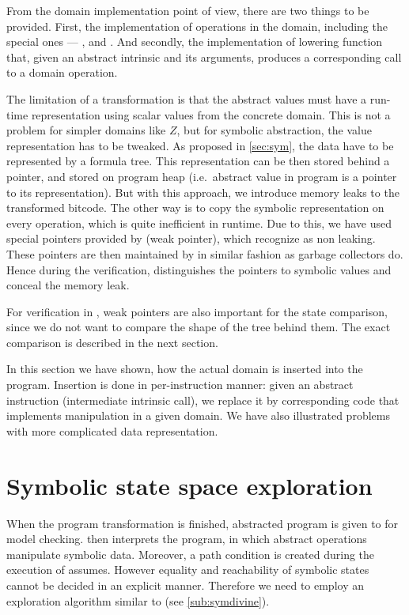 From the domain implementation point of view, there are two things to be
provided. First, the implementation of operations in the domain, including
the special ones --- ,  and .
And secondly, the implementation of lowering function that, given an abstract
\LART intrinsic and its arguments, produces a corresponding call to a domain
operation.

The limitation of a transformation is that the abstract values must have a
run-time representation using scalar values from the concrete domain. This is
not a problem for simpler domains like $Z$, but for symbolic abstraction, the
value representation has to be tweaked. As proposed in \autoref{sec:sym}, the
data have to be represented by a formula tree. This representation can be
then stored behind a pointer, and stored on program heap (i.e.~abstract value in
program is a pointer to its representation). But with this approach, we
introduce memory leaks to the transformed bitcode. The other way is to copy the symbolic
representation on every operation, which is quite inefficient in runtime. Due to
this, we have used special pointers provided by \DIVINE (weak pointer), which
\DIVINE recognize as non leaking. These pointers are then maintained by \DIVM in
similar fashion as garbage collectors do. Hence during the verification, \DIVINE
distinguishes the pointers to symbolic values and conceal the memory leak.

For verification in \DIVINE, weak pointers are also important for the state
comparison, since we do not want to compare the shape of the tree behind them.
The exact comparison is described in the next section.

\begin{summary}
In this section we have shown, how the actual domain is inserted into the
program. Insertion is done in per-instruction manner: given an abstract
instruction (intermediate intrinsic call), we replace it by corresponding code
that implements manipulation in a given domain. We have also illustrated
problems with more complicated data representation.
\end{summary}

\section{Symbolic state space exploration} \label{sec:symbolic}

When the program transformation is finished, abstracted program is given to
\DIVINE for model checking. \DIVINE then interprets the program, in which
abstract operations manipulate symbolic data. Moreover, a path condition is
created during the execution of assumes. However equality and reachability of
symbolic states cannot be decided in an explicit manner. Therefore we need to
employ an exploration algorithm similar to
\SymDIVINE (see \autoref{sub:symdivine}).

